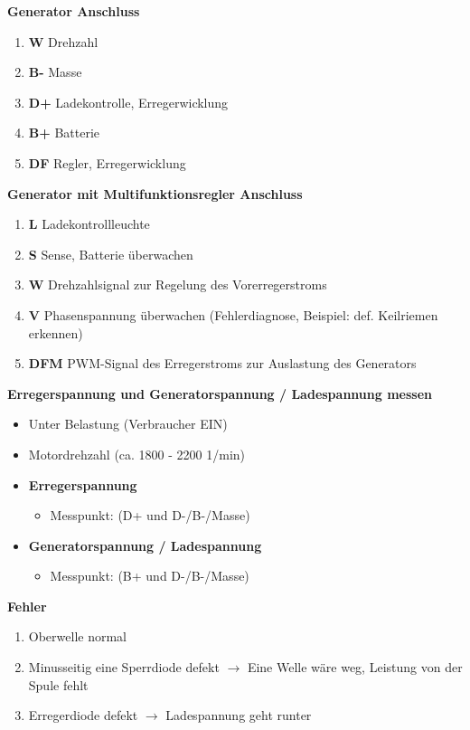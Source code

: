 \textbf{Generator Anschluss}

\begin{enumerate}
\item
  \textbf{W} Drehzahl
\item
  \textbf{B-} Masse
\item
  \textbf{D+} Ladekontrolle, Erregerwicklung
\item
  \textbf{B+} Batterie
\item
  \textbf{DF} Regler, Erregerwicklung
\end{enumerate}

\textbf{Generator mit Multifunktionsregler Anschluss}

\begin{enumerate}
\item
  \textbf{L} Ladekontrollleuchte
\item
  \textbf{S} Sense, Batterie überwachen
\item
  \textbf{W} Drehzahlsignal zur Regelung des Vorerregerstroms
\item
  \textbf{V} Phasenspannung überwachen (Fehlerdiagnose, Beispiel: def.
  Keilriemen erkennen)
\item
  \textbf{DFM} PWM-Signal des Erregerstroms zur Auslastung des
  Generators
\end{enumerate}

\textbf{Erregerspannung und Generatorspannung / Ladespannung messen}

\begin{itemize}
\item
  Unter Belastung (Verbraucher EIN)
\item
  Motordrehzahl (ca. 1800 - 2200 1/min)
\item
  \textbf{Erregerspannung}

  \begin{itemize}
  \item
    Messpunkt: (D+ und D-/B-/Masse)
  \end{itemize}
\item
  \textbf{Generatorspannung / Ladespannung}

  \begin{itemize}
  \item
    Messpunkt: (B+ und D-/B-/Masse)
  \end{itemize}
\end{itemize}

\textbf{Fehler}

\begin{enumerate}
\item
  Oberwelle normal
\item
  Minusseitig eine Sperrdiode defekt $\to$ Eine Welle wäre weg,
  Leistung von der Spule fehlt
\item
  Erregerdiode defekt $\to$ Ladespannung geht runter
\end{enumerate}

